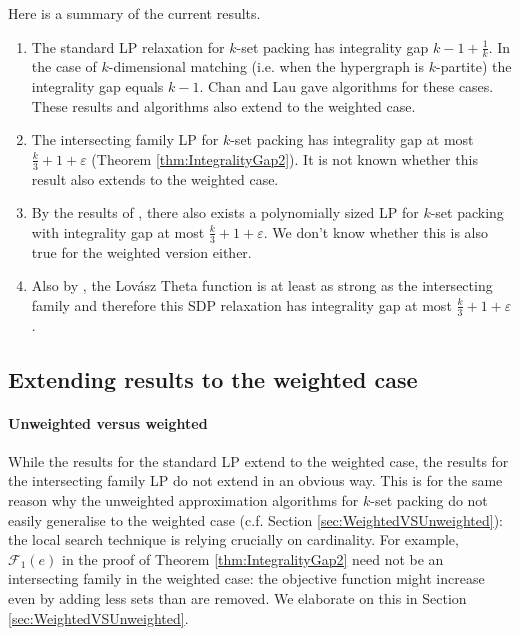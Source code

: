 Here is a summary of the current results.
%
\begin{enumerate}
  \item The standard LP relaxation for $k$-set packing has integrality gap $k - 1 + \frac{1}{k}$. In the case of $k$-dimensional matching (i.e. when the hypergraph is $k$-partite) the integrality gap equals $k - 1$. Chan and Lau \cite{LapChiLau} gave algorithms for these cases. These results and algorithms also extend to the weighted case.
  \item The intersecting family LP for $k$-set packing has integrality gap at most $\frac{k}{3} + 1 + \varepsilon$ (Theorem \ref{thm:IntegralityGap2}). It is not known whether this result also extends to the weighted case.
  \item By the results of \cite{LapChiLau}, there also exists a polynomially sized LP for $k$-set packing with integrality gap at most $\frac{k}{3} + 1 + \varepsilon$. We don't know whether this is also true for the weighted version either.
  \item Also by \cite{LapChiLau}, the Lov\'{a}sz Theta function is at least as strong as the intersecting family and therefore this SDP relaxation has integrality gap at most $\frac{k}{3} + 1 + \varepsilon$.
\end{enumerate}

\subsection{Extending results to the weighted case}\label{subsec:WeightedLP}

\paragraph{Unweighted versus weighted} While the results for the standard LP extend to the weighted case, the results for the intersecting family LP do not extend in an obvious way. This is for the same reason why the unweighted approximation algorithms for $k$-set packing do not easily generalise to the weighted case (c.f. Section \ref{sec:WeightedVSUnweighted}): the local search technique is relying crucially on cardinality. For example, $\mathcal{F}_1(e)$ in the proof of Theorem \ref{thm:IntegralityGap2} need not be an intersecting family in the weighted case: the objective function might increase even by adding less sets than are removed. We elaborate on this in Section \ref{sec:WeightedVSUnweighted}. %

